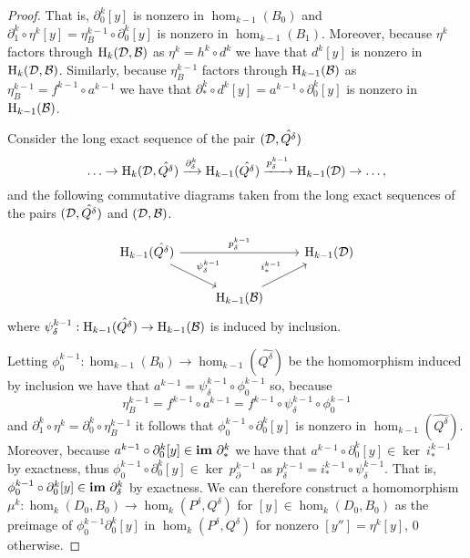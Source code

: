 \begin{proof}
  That is, $\partial_0^k[y]$ is nonzero in $\hom_{k-1}(B_0)$ and $\partial_1^k\circ\eta^k[y] = \eta_B^{k-1}\circ\partial_0^k[y]$ is nonzero in $\hom_{k-1}(B_1)$.
  Moreover, because $\eta^k$ factors through $\mathrm{H}_k({\mathcal{D}}, {\mathcal{B}})$ as $\eta^k = h^k\circ d^k$ we have that $d^k[y]$ is nonzero in $\mathrm{H}_k({\mathcal{D}},{\mathcal{B}})$.
  Similarly, because $\eta^{k-1}_B$ factors through $\mathrm{H}_{k-1}({\mathcal{B}})$ as $\eta^{k-1}_B = f^{k-1}\circ a^{k-1}$ we have that $\partial^k_*\circ d^k[y] = a^{k-1}\circ \partial_0^k[y]$ is nonzero in $\mathrm{H}_{k-1}({\mathcal{B}})$.

  Consider the long exact sequence of the pair $({\mathcal{D}}, \hat{Q^\delta})$
  \[\ldots\to\mathrm{H}_k({\mathcal{D}}, \hat{Q^\delta})\xrightarrow{\partial^k_\delta}
    \mathrm{H}_{k-1}(\hat{Q^\delta})\xrightarrow{p^{k-1}_\delta}
    \mathrm{H}_{k-1}({\mathcal{D}})\to\ldots,\]
  and the following commutative diagrams taken from the long exact sequences of the pairs $({\mathcal{D}}, \hat{Q^\delta})$ and $({\mathcal{D}}, {\mathcal{B}})$.

  \begin{equation}\label{eq:main1}\begin{tikzcd}
      \hom_{k-1}(\hat{Q^\delta})\arrow{dr}{\psi_\delta^{k-1}}\arrow{rr}{p_\delta^{k-1}} & &
      \hom_{k-1}(\D)\\
    & \hom_{k-1}(\B)\arrow{ur}{i_*^{k-1}}
  \end{tikzcd}\end{equation}
  where $\psi_\delta^{k-1} : \mathrm{H}_{k-1}(\hat{Q^\delta})\to \mathrm{H}_{k-1}({\mathcal{B}})$ is induced by inclusion.

  Letting $\phi_0^{k-1} : \hom_{k-1}(B_0)\to\hom_{k-1}(\hat{Q^\delta})$ be the homomorphism induced by inclusion we have that $a^{k-1} = \psi_\delta^{k-1}\circ\phi_0^{k-1}$ so, because
  \[\eta_B^{k-1} = f^{k-1}\circ a^{k-1} = f^{k-1}\circ \psi_\delta^{k-1}\circ\phi_0^{k-1}\]
  and $\partial_1^k\circ\eta^k = \partial_0^k\circ \eta_B^{k-1}$ it follows that $\phi_0^{k-1}\circ\partial_0^k[y]$ is nonzero in $\hom_{k-1}(\hat{Q^\delta})$.
  Moreover, because $a^{k-1}\circ\partial_0^k[y]\in\mathbf{im}~\partial_*^k$ we have that $a^{k-1}\circ\partial_0^k[y]\in\ker~i_*^{k-1}$ by exactness, thus
  $\phi_0^{k-1}\circ\partial_0^k[y]\in \ker~p_\partial^{k-1}$ as $p_\delta^{k-1} = i_*^{k-1}\circ\psi_\delta^{k-1}$.
  That is, $\phi_0^{k-1}\circ\partial_0^k[y]\in \mathbf{im}~\partial_\delta^{k}$ by exactness.
  We can therefore construct a homomorphism $\mu^k : \hom_k(D_0, B_0) \to \hom_k(P^\delta, Q^\delta)$ for $[y]\in \hom_k(D_0, B_0)$ as the preimage of $\phi_0^{k-1}\partial_0^k[y]$ in $\hom_k(P^\delta, Q^\delta)$ for nonzero $[y''] = \eta^k[y]$, $0$ otherwise.



\end{proof}
